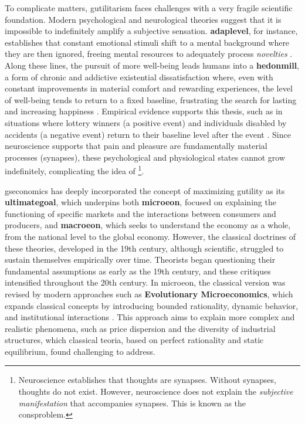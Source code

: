\documentclass[./main_en.tex]{subfiles}
\begin{document}
\par To complicate matters, \gls{gutilitarism} faces challenges with a very fragile scientific foundation. Modern psychological and neurological theories suggest that it is impossible to indefinitely amplify a subjective sensation. \textbf{\gls{adaplevel}}, for instance, establishes that constant emotional stimuli shift to a mental background where they are then ignored, freeing mental resources to adequately process \textit{novelties} \cite{Edwards_2018}. Along these lines, the pursuit of more well-being leads humans into a \textbf{\gls{hedonmill}}, a form of chronic and addictive existential dissatisfaction where, even with constant improvements in material comfort and rewarding experiences, the level of well-being tends to return to a fixed baseline, frustrating the search for lasting and increasing happiness \cite{Diener2009}. Empirical evidence supports this thesis, such as in situations where lottery winners (a positive event) and individuals disabled by accidents (a negative event) return to their baseline level after the event \cite{Brickman_1978}. Since neuroscience supports that pain and pleasure are fundamentally material processes (synapses), these psychological and physiological states cannot grow indefinitely, complicating the idea of \footnote{Neuroscience establishes that thoughts are synapses. Without synapses, thoughts do not exist. However, neuroscience does not explain the \textit{subjective manifestation} that accompanies synapses. This is known as the \gls{consproblem}.}.

\par \gls{gseconomics} has deeply incorporated the concept of maximizing \gls{gutility} as its \textbf{\gls{ultimategoal}}, which underpins both \textbf{\gls{microeon}}, focused on explaining the functioning of specific markets and the interactions between consumers and producers, and \textbf{\gls{macroeon}}, which seeks to understand the economy as a whole, from the national level to the global economy. However, the classical doctrines of these theories, developed in the 19th century, although scientific, struggled to sustain themselves empirically over time. Theorists began questioning their fundamental assumptions as early as the 19th century, and these critiques intensified throughout the 20th century. In \gls{microeon}, the classical version was revised by modern approaches such as \textbf{Evolutionary Microeconomics}, which expands classical concepts by introducing bounded rationality, dynamic behavior, and institutional interactions \cite{Nelson1985a, Bourgine2006a}. This approach aims to explain more complex and realistic phenomena, such as price dispersion and the diversity of industrial structures, which classical \gls{teoria}, based on perfect rationality and static equilibrium, found challenging to address.
\end{document}
